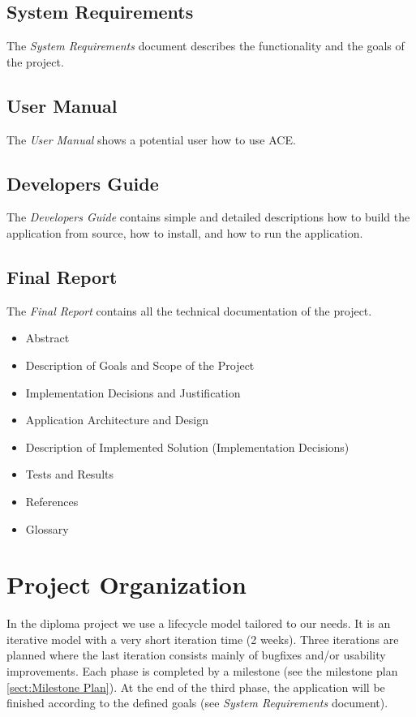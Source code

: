 \documentclass[11pt,a4paper]{article}
\begin{document}
\subsection{System Requirements}
The \emph{System Requirements} document describes the functionality and
the goals of the project.

\subsection{User Manual}
The \emph{User Manual} shows a potential user how to use ACE.

\subsection{Developers Guide}
The \emph{Developers Guide} contains simple and detailed descriptions how
to build the application from source, how to install, and how to run
the application. 

\subsection{Final Report}
The \emph{Final Report} contains all the technical documentation of the project.
\begin{itemize}
 \item Abstract
 \item Description of Goals and Scope of the Project
 \item Implementation Decisions and Justification
 \item Application Architecture and Design
 \item Description of Implemented Solution (Implementation Decisions)
 \item Tests and Results
 \item References
 \item Glossary
\end{itemize}


\section{Project Organization}

In the diploma project we use a lifecycle model tailored to our needs. It is an
iterative model with a very short iteration time (2 weeks). Three iterations 
are planned where the last iteration consists mainly of bugfixes and/or
usability improvements. Each phase is completed by a milestone (see the 
milestone plan \ref{sect:Milestone Plan}). At the end of the third phase, the 
application will be finished according to the defined goals (see
\emph{System Requirements} document).
\end{document}
